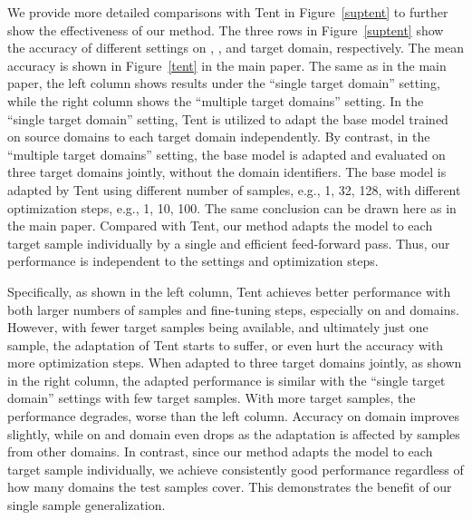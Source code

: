 \documentclass{article} \usepackage[table]{xcolor}
\begin{document}
We provide more detailed comparisons with Tent \cite{wang2021tent} in Figure~\ref{suptent} to further show the effectiveness of our method.
The three rows in Figure~\ref{suptent} show the accuracy of different settings on , , and  target domain, respectively. The mean accuracy is shown in Figure~\ref{tent} in the main paper.
The same as in the main paper, the left column shows results under the ``single target domain'' setting, while the right column shows the ``multiple target domains'' setting.
In the ``single target domain'' setting, Tent is utilized to adapt the base model trained on source domains to each target domain independently.
By contrast, in the ``multiple target domains'' setting, the base model is adapted and evaluated on three target domains jointly, without the domain identifiers.
The base model is adapted by Tent using different number of samples, e.g., 1, 32, 128, with different optimization steps, e.g., 1, 10, 100.
The same conclusion can be drawn here as in the main paper.
Compared with Tent, our method adapts the model to each target sample individually by a single and efficient feed-forward pass. 
Thus, our performance is independent to the settings and optimization steps.

Specifically, as shown in the left column, Tent achieves better performance with both larger numbers of samples and fine-tuning steps, especially on  and  domains.
However, with fewer target samples being available, and ultimately just one sample, the adaptation of Tent starts to suffer, or even hurt the accuracy with more optimization steps.
When adapted to three target domains jointly, as shown in the right column, the adapted performance is similar with the ``single target domain'' settings with few target samples.
With more target samples, the performance degrades, worse than the left column. 
Accuracy on  domain improves slightly, while on  and  domain even drops as the adaptation is affected by samples from other domains.
In contrast, since our method adapts the model to each target sample individually, we achieve consistently good performance regardless of how many domains the test samples cover. This demonstrates the benefit of our single sample generalization.
\end{document}
